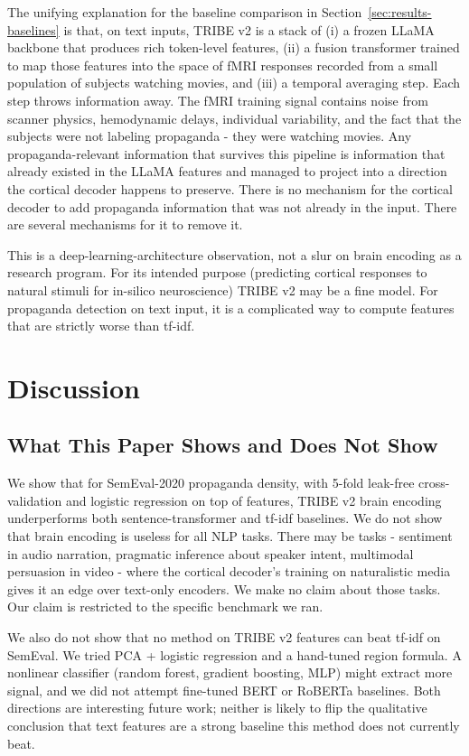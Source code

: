 \documentclass[11pt]{article}
\begin{document}
The unifying explanation for the baseline comparison in Section~\ref{sec:results-baselines} is that, on text inputs, TRIBE v2 is a stack of (i) a frozen LLaMA backbone that produces rich token-level features, (ii) a fusion transformer trained to map those features into the space of fMRI responses recorded from a small population of subjects watching movies, and (iii) a temporal averaging step. Each step throws information away. The fMRI training signal contains noise from scanner physics, hemodynamic delays, individual variability, and the fact that the subjects were not labeling propaganda - they were watching movies. Any propaganda-relevant information that survives this pipeline is information that already existed in the LLaMA features and managed to project into a direction the cortical decoder happens to preserve. There is no mechanism for the cortical decoder to add propaganda information that was not already in the input. There are several mechanisms for it to remove it.

This is a deep-learning-architecture observation, not a slur on brain encoding as a research program. For its intended purpose (predicting cortical responses to natural stimuli for in-silico neuroscience) TRIBE v2 may be a fine model. For propaganda detection on text input, it is a complicated way to compute features that are strictly worse than tf-idf.

\section{Discussion}

\subsection{What This Paper Shows and Does Not Show}

We show that for SemEval-2020 propaganda density, with 5-fold leak-free cross-validation and logistic regression on top of features, TRIBE v2 brain encoding underperforms both sentence-transformer and tf-idf baselines. We do not show that brain encoding is useless for all NLP tasks. There may be tasks - sentiment in audio narration, pragmatic inference about speaker intent, multimodal persuasion in video - where the cortical decoder's training on naturalistic media gives it an edge over text-only encoders. We make no claim about those tasks. Our claim is restricted to the specific benchmark we ran.

We also do not show that no method on TRIBE v2 features can beat tf-idf on SemEval. We tried PCA + logistic regression and a hand-tuned region formula. A nonlinear classifier (random forest, gradient boosting, MLP) might extract more signal, and we did not attempt fine-tuned BERT or RoBERTa baselines. Both directions are interesting future work; neither is likely to flip the qualitative conclusion that text features are a strong baseline this method does not currently beat.
\end{document}
